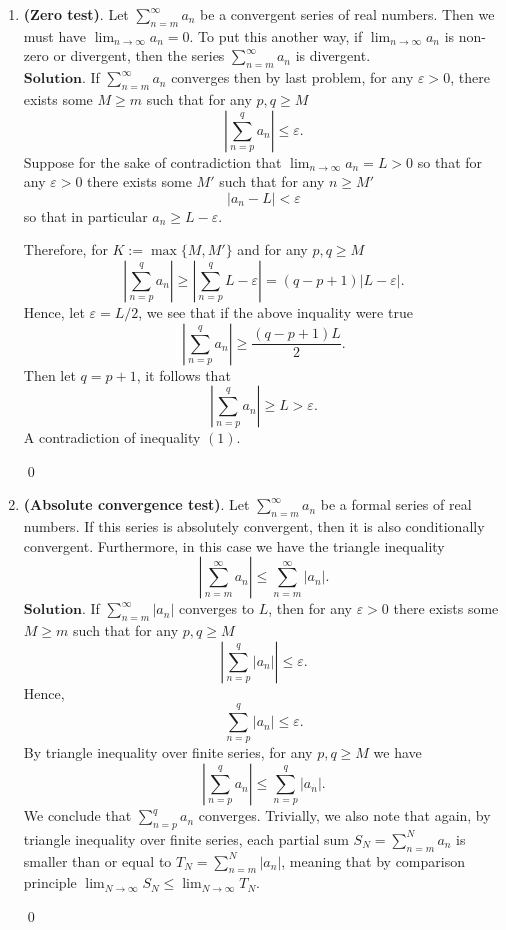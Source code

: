 \documentclass{article}
\theoremstyle{remark}
\begin{document}
\begin{enumerate}
    \item \textbf{(Zero test)}. Let \( \sum_{n=m}^{\infty} a_n \) be a convergent series of real numbers. Then we must have \( \lim_{n \to \infty} a_n = 0 \). To put this another way, if \( \lim_{n \to \infty} a_n \) is non-zero or divergent, then the series \( \sum_{n=m}^{\infty} a_n \) is divergent.
    \\$\textbf{Solution.}$
    If $\sum_{n=m}^{\infty}a_n$ converges then by last problem, for any $\varepsilon > 0$, there exists some $M \geq m$ such that for any $p,q \geq M$
    \begin{equation}
        \left \lvert \sum_{n=p}^{q} a_n \right\rvert \leq \varepsilon.
    \end{equation}
    Suppose for the sake of contradiction that $\lim_{n\to\infty}a_n = L > 0$ so that for any $\varepsilon > 0$ there exists 
    some $M'$ such that for any $n \geq M'$ 
    \[
    \vert a_n - L \vert < \varepsilon
    \]
    so that in particular $a_n \geq L-\varepsilon$.

    Therefore, for $K := \max\{M, M'\}$ and for any $p,q \geq M$
    \[
    \left \lvert \sum_{n=p}^{q} a_n \right\rvert \geq \left| \sum_{n=p}^{q} L- \varepsilon \right| = (q-p+1)\left| L - \varepsilon \right|.
    \]
    Hence, let $\varepsilon = L/2$, we see that if the above inquality were true 
    \[
    \left \lvert \sum_{n=p}^{q} a_n \right\rvert \geq \frac{(q-p+1)L}{2}.
    \]
    Then let $q = p+1$, it follows that 
    \[
        \left \lvert \sum_{n=p}^{q} a_n \right\rvert \geq L > \varepsilon. 
    \]
    A contradiction of inequality $(1)$.
    \begin{flushright}
        \qed
    \end{flushright}

    \item \textbf{(Absolute convergence test)}. Let \( \sum_{n=m}^{\infty} a_n \) be a formal series of real numbers. If this series is absolutely convergent, then it is also conditionally convergent. Furthermore, in this case we have the triangle inequality
    \[
    \left| \sum_{n=m}^{\infty} a_n \right| \leq \sum_{n=m}^{\infty} |a_n|.
    \]
    $\textbf{Solution.}$
    If $\sum_{n=m}^{\infty}\vert a_n \vert$ converges to $L$, then for any $\varepsilon > 0$ there exists some 
    $M \geq m$ such that for any $p,q \geq M$
    \[
    \left\lvert \sum_{n=p}^{q}\vert a_n \vert \right\rvert \leq \varepsilon.
    \]
    Hence, 
    \[
    \sum_{n=p}^{q}\vert a_n \vert \leq \varepsilon.
    \]
    By triangle inequality over finite series, for any $p,q \geq M$ we have
    \[
    \left\lvert \sum_{n=p}^{q} a_n \right\rvert \leq \sum_{n=p}^{q}\vert a_n \vert.
    \]
    We conclude that $\sum_{n=p}^{q}a_n$ converges. Trivially, we also note that again, by triangle inequality over 
    finite series, each partial sum $S_N = \sum_{n=m}^{N}a_n$ is smaller than or equal to $T_N = \sum_{n=m}^{N}\vert a_n \vert$,
    meaning that by comparison principle $\lim_{N\to\infty}S_N \leq \lim_{N\to\infty}T_N$.
    \begin{flushright}
        \qed
    \end{flushright}


\end{enumerate}
\end{document}
